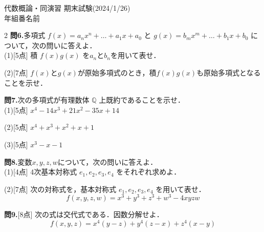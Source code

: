 \documentclass[a4paper,11pt]{jsarticle}
\newcommand{\testheader}{
\begin{center}
{\large 代数概論・同演習 期末試験(2024/1/26)}\\[1em]
\underline{\hspace{1cm}}年\underline{\hspace{1cm}}組\underline{\hspace{1cm}}番\hspace{0.5cm}名前\underline{\hspace{6cm}}
\end{center}
}
\begin{document}
\newpage
\testheader
\begin{multicols*}{2}
\noindent
\textbf{問6.}\quad 多項式 $f(x) = a_n x^n + \dots + a_1 x + a_0$ と $g(x) = b_m x^m + \dots + b_1 x + b_0$ について，次の問いに答えよ．\\[0.5em]
(1)[5点] 積 $f(x)g(x)$ を$a_n$と$b_n$を用いて表せ．
\vspace{7cm}

\noindent
(2)[7点] $f(x)$と$g(x)$が原始多項式のとき，積$f(x)g(x)$も原始多項式となることを示せ．
\vspace{14.5cm}

\vfill\null
\columnbreak
\noindent
\textbf{問7.}\quad 次の多項式が有理数体 $\mathbb{Q}$ 上既約であることを示せ．\\
(1)[5点] $x^4 - 14x^3 + 21x^2 - 35x + 14$
\vspace{7cm}

\noindent
(2)[5点] $x^4 + x^3 + x^2 + x + 1$
\vspace{7cm}

\noindent
(3)[5点] $x^3 - x - 1$
\vspace{7cm}

\vfill\null
\newpage
\noindent
\textbf{問8.}\quad 変数$x,y,z,w$について，次の問いに答えよ．\\
(1)[4点] 4次基本対称式 $e_1, e_2, e_3, e_4$ をそれぞれ求めよ．
\vspace{5cm}

\noindent
(2)[7点] 次の対称式を，基本対称式 $e_1, e_2, e_3, e_4$ を用いて表せ．
$$ f(x,y,z,w)=x^3 + y^3 + z^3 + w^3 - 4xyzw$$ 
\vspace{10cm}

\vfill\null
\columnbreak
\noindent
\textbf{問9.}[8点] 次の式は交代式である．因数分解せよ．
$$ f(x,y,z)=x^4(y-z) + y^4(z-x) + z^4(x-y) $$
\vspace{22cm}

\vfill\null
\end{multicols*}
\end{document}

